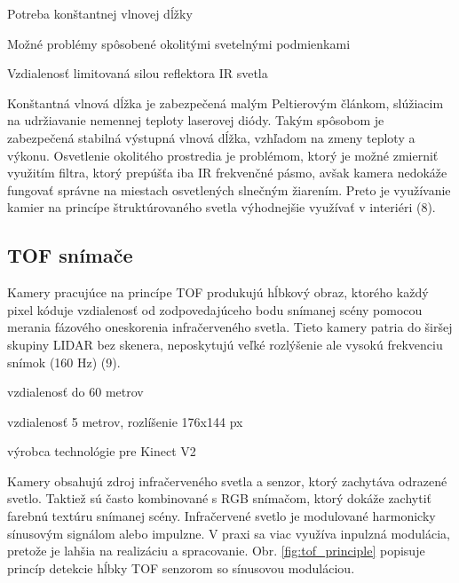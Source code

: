 \begin{description}[leftmargin=*,labelsep=5.8mm, font=$\bullet$~\normalfont\scshape\color{black!20!black}]
	\item Potreba konštantnej vlnovej dĺžky 
	\item Možné problémy spôsobené okolitými svetelnými podmienkami 
	\item Vzdialenosť limitovaná silou reflektora IR svetla
\end{description}

Konštantná vlnová dĺžka je zabezpečená malým Peltierovým článkom, slúžiacim na
udržiavanie nemennej teploty laserovej diódy. Takým spôsobom je zabezpečená stabilná výstupná
vlnová dĺžka, vzhľadom na zmeny teploty a výkonu. Osvetlenie okolitého prostredia je
problémom, ktorý je možné zmierniť využitím filtra, ktorý prepúšťa iba IR frekvenčné pásmo,
avšak kamera nedokáže fungovať správne na miestach osvetlených slnečným žiarením. Preto je
využívanie kamier na princípe štruktúrovaného svetla výhodnejšie využívať v interiéri (8).

\subsection{TOF snímače}
\label{sec:tof}
Kamery pracujúce na princípe TOF produkujú hĺbkový obraz, ktorého každý pixel kóduje
vzdialenosť od zodpovedajúceho bodu snímanej scény pomocou merania fázového oneskorenia
infračerveného svetla. Tieto kamery patria do širšej skupiny LIDAR bez skenera, neposkytujú
veľké rozlýšenie ale vysokú frekvenciu snímok (160 Hz) (9).

\begin{description}[leftmargin=*,labelsep=5.8mm, font=$\bullet$~\normalfont\scshape\color{black!20!black}]
	\item [Photonic Mixer Devices (PMD)] vzdialenosť do 60 metrov
	\item [Swiss Ranger] vzdialenosť 5 metrov, rozlíšenie 176x144 px
	\item [CanestaVision] výrobca technológie pre Kinect V2
\end{description}

Kamery obsahujú zdroj infračerveného svetla a senzor, ktorý zachytáva odrazené svetlo.
Taktiež sú často kombinované s RGB snímačom, ktorý dokáže zachytiť farebnú textúru snímanej
scény. Infračervené svetlo je modulované harmonicky sínusovým signálom alebo impulzne. V praxi sa viac využíva inpulzná modulácia, pretože je lahšia na realizáciu a spracovanie. Obr. \ref{fig:tof_principle} popisuje princíp detekcie hĺbky TOF senzorom so sínusovou moduláciou.


